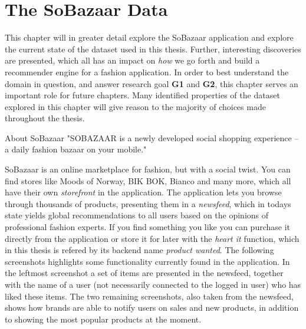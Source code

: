 
\chapter{The SoBazaar Data}
\label{chap:thesobazaardata}
\minitoc

This chapter will in greater detail explore the SoBazaar application and
explore the current state of the dataset used in this thesis. Further,
interesting discoveries are presented, which all has an impact on \textit{how}
we go forth and build a recommender engine for a fashion application. In order
to best understand the domain in question, and answer research goal \textbf{G1}
and \textbf{G2}, this chapter serves an important role for future chapters.
Many identified properties of the dataset explored in this chapter will give
reason to the majority of choices made throughout the thesis.

\clearpage


\begin{chapquote}[30pt]{About SoBazaar}
  "SOBAZAAR is a newly developed social shopping experience -- a daily fashion bazaar on your mobile."
\end{chapquote}

SoBazaar is an online marketplace for fashion, but with a social twist. You can
find stores like Moods of Norway, BIK BOK, Bianco and many more, which all have
their own \textit{storefront} in the application. The application lets you
browse through thousands of products, presenting them in a \textit{newsfeed},
which in todays state yields global recommendations to all users based on the
opinions of professional fashion experts. If you find something you like you
can purchase it directly from the application or store it for later with the
\emph{heart it} function, which in this thesis is refered by its backend name
\textit{product wanted}. The following screenshots highlights some
functionality currently found in the application. In the leftmost screenshot a
set of items are presented in the newsfeed, together with the name of a user
(not necessarily connected to the logged in user) who has liked these items.
The two remaining screenshots, also taken from the newsfeed, shows how brands
are able to notify users on sales and new products, in addition to showing the
most popular products at the moment.

